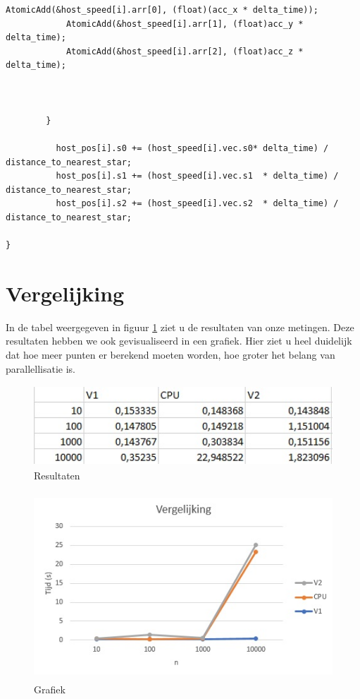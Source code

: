 \documentclass[11pt,a4paper]{article}
\begin{document}
\begin{lstlisting}[style=CStyle]
			AtomicAdd(&host_speed[i].arr[0], (float)(acc_x * delta_time));
    		AtomicAdd(&host_speed[i].arr[1], (float)acc_y * delta_time);
    		AtomicAdd(&host_speed[i].arr[2], (float)acc_z * delta_time);



        }

      	  host_pos[i].s0 += (host_speed[i].vec.s0* delta_time) / distance_to_nearest_star;
      	  host_pos[i].s1 += (host_speed[i].vec.s1  * delta_time) / distance_to_nearest_star;
       	  host_pos[i].s2 += (host_speed[i].vec.s2  * delta_time) / distance_to_nearest_star;
   		
}
		\end{lstlisting}
		
	\section{Vergelijking}
	In de tabel weergegeven in figuur \ref{tabel} ziet u de resultaten van onze metingen. Deze resultaten hebben we ook gevisualiseerd in een grafiek. Hier ziet u heel duidelijk dat hoe meer punten er berekend moeten worden, hoe groter het belang van parallellisatie is.
	
	\begin{figure}[htbp]
		\caption{Resultaten}
		\label{tabel}
		\centerline{\includegraphics[height=3cm]{waarden.jpg}}
	\end{figure}
	\begin{figure}[htbp]
		\caption{Grafiek}
		\centerline{\includegraphics[height=7cm]{grafiek.jpg}}
	\end{figure}
\end{document}
